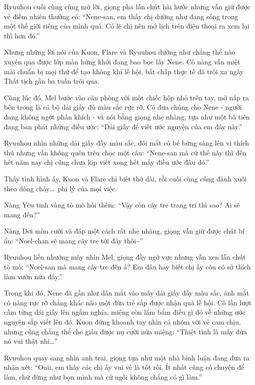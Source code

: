 \documentclass[../main.tex]{subfiles}
\begin{document}
Ryuuhou cuối cùng cũng mở lời, giọng pha lẫn chút hài hước nhưng vẫn giữ được vẻ điềm nhiên thường có: ``Nene-san, em thấy chị dường như đang sống trong một thế giới riêng của mình quá. Có lẽ chị nên mở lịch trên điện thoại ra xem lại thì hơn đó.''

Nhưng những lời nói của Kuon, Flare và Ryuuhou dường như chẳng thể nào xuyên qua được lớp màn hứng khởi đang bao bọc lấy Nene. Cô nàng vẫn miệt mài chuẩn bị mọi thứ để tạo không khí lễ hội, bất chấp thực tế đã trôi xa ngày Thất tịch gần ba tuần trôi qua.

Cùng lúc đó, Mel bước vào căn phòng với một chiếc hộp nhỏ trên tay, mở nắp ra bên trong là cả bộ dải giấy đủ màu sắc rực rỡ. Cô đưa chúng cho Nene - người đang không ngớt phấn khích - và nói bằng giọng nhẹ nhàng, tựa như một bà tiên đang ban phát những điều ước: ``Dải giấy để viết ước nguyện của em đây này.''


Ryuuhou nhìn những dải giấy đầy màu sắc, đôi mắt cô bé bừng sáng lên vì thích thú nhưng vẫn không quên trêu chọc một câu: ``Nene-san mà cứ thế này thì đến hết năm nay chị cũng chưa kịp viết xong hết mấy điều ước đâu đó.''

Thấy tình hình ấy, Kuon và Flare chỉ biết thở dài, rồi cuối cùng cũng đành xuôi theo dòng chảy\dots\ phi lý của mọi việc.

Nàng Yêu tinh vàng tò mò hỏi thêm: ``Vậy còn cây tre trang trí thì sao? Ai sẽ mang đến?''

Nàng Dơi mỉm cười và đáp một cách rất nhẹ nhàng, giọng vẫn giữ được chút bí ẩn: ``Noel-chan sẽ mang cây tre tới đây thôi\~{}''

Ryuuhou liền nhướng mày nhìn Mel, giọng đầy ngờ vực nhưng vẫn xen lẫn chút tò mò: ``Noel-san mà mang cây tre đến á? Em đâu hay biết chị ấy còn có sở thích làm vườn nữa đấy.''

Trong khi đó, Nene đã gần như dán mắt vào mấy dải giấy đầy màu sắc, ánh mắt cô nàng rực rỡ chẳng khác nào một đứa trẻ sắp được nhận quà lễ hội. Cô lần lượt cầm từng dải giấy lên ngắm nghía, miệng còn lẩm bẩm điều gì đó về những ước nguyện sắp viết lên đó. Kuon đứng khoanh tay nhìn cả nhóm với vẻ cam chịu, nhưng cũng chẳng thể che giấu được nụ cười nửa miệng: ``Thiệt tình là mấy đứa nó vui thật nhỉ\dots''

Ryuuhou quay sang nhìn anh trai, giọng tựa như một nhà bình luận đang đưa ra nhận xét: ``Onii, em thấy các chị ấy vui vẻ là tốt rồi. Ít nhất cũng có chuyện để làm, chứ đừng như bọn mình mà cứ ngồi không chẳng có gì làm.''
\end{document}
